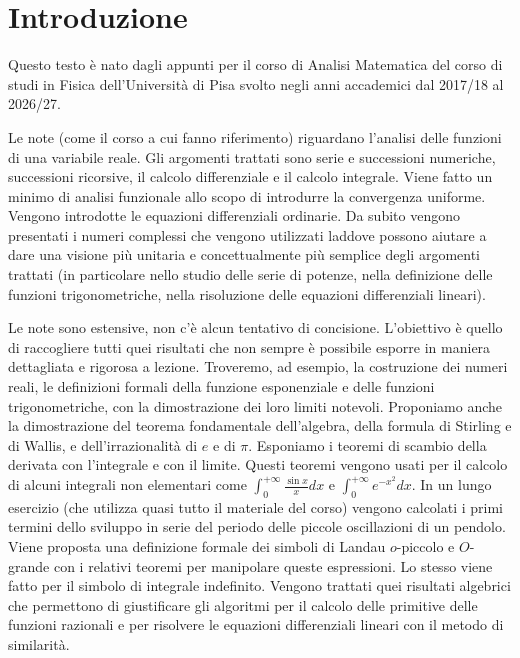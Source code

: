 \chapter*{Introduzione}


Questo testo è nato dagli appunti per il corso di Analisi Matematica %
del corso di studi in Fisica dell'Università %
di Pisa svolto negli anni accademici dal 2017/18 al 2026/27. %

Le note (come il corso a cui fanno riferimento) %
riguardano l'analisi delle funzioni di una variabile %
reale. %
Gli argomenti trattati sono serie e successioni numeriche, %
successioni ricorsive, %
il calcolo differenziale e il calcolo integrale. %
Viene fatto un minimo di analisi funzionale allo scopo di introdurre la convergenza uniforme. Vengono introdotte le equazioni differenziali ordinarie. %
Da subito vengono presentati i numeri complessi che vengono utilizzati %
laddove possono aiutare a dare una visione più unitaria e concettualmente %
più semplice degli argomenti trattati (in particolare nello studio delle serie %
di potenze, nella definizione delle funzioni trigonometriche, nella risoluzione delle equazioni differenziali lineari). %

Le note sono estensive, non c'è alcun tentativo di concisione. %
L'obiettivo è quello di raccogliere tutti quei risultati che non sempre è %
possibile esporre in maniera dettagliata e rigorosa a lezione. %
Troveremo, ad esempio, %
la costruzione dei numeri reali,
le definizioni %
formali della funzione esponenziale e delle funzioni trigonometriche, con la dimostrazione dei loro limiti notevoli. %
Proponiamo anche la dimostrazione del teorema fondamentale dell'algebra, %
della formula di Stirling e di Wallis, %
e dell'irrazionalità di $e$ e di $\pi$. %
Esponiamo i teoremi di scambio della derivata con l'integrale e con il limite. Questi teoremi vengono usati per il calcolo di alcuni integrali non elementari come $\int_0^{+\infty} \frac{\sin x}{x} dx$ e $\int_0^{+\infty} e^{-x^2} dx$. %
In un lungo esercizio (che utilizza quasi tutto il materiale del corso) vengono calcolati i primi termini dello sviluppo in serie del periodo delle piccole oscillazioni di un pendolo. %
Viene proposta una definizione formale dei simboli di Landau %
$o$-piccolo e $O$-grande con i relativi teoremi per manipolare queste espressioni. %
Lo stesso viene fatto per il simbolo di integrale indefinito. %
Vengono trattati quei risultati algebrici che permettono di %
giustificare gli algoritmi per il calcolo delle primitive %
delle funzioni razionali e per risolvere le equazioni differenziali %
lineari con il metodo di similarità. %

